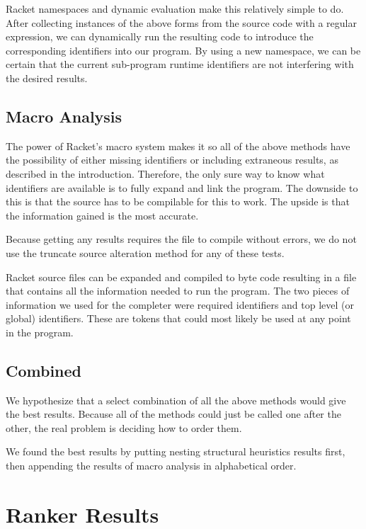 \documentclass[ms,electronic,twosidetoc,letterpaper,chaptercenter,parttop,lol,lof,lot]{byumsphd}
\begin{document}
Racket namespaces and dynamic evaluation make this relatively simple to do.
After collecting instances of the above forms from the source code with a regular expression, we can dynamically run the resulting code to introduce the corresponding identifiers into our program.
By using a new namespace, we can be certain that the current sub-program runtime identifiers are not interfering with the desired results.

\subsection{Macro Analysis}

The power of Racket's macro system makes it so all of the above methods have the possibility of either missing identifiers or including extraneous results, as described in the introduction.
Therefore, the only sure way to know what identifiers are available is to fully expand and link the program.
The downside to this is that the source has to be compilable for this to work.
The upside is that the information gained is the most accurate.

Because getting any results requires the file to compile without errors, we do not use the truncate source alteration method for any of these tests.

Racket source files can be expanded and compiled to byte code resulting in a file that contains all the information needed to run the program.
The two pieces of information we used for the completer were required identifiers and top level (or global) identifiers.
These are tokens that could most likely be used at any point in the program.

\subsection{Combined}

We hypothesize that a select combination of all the above methods would give the best results.
Because all of the methods could just be called one after the other, the real problem is deciding how to order them.

We found the best results by putting nesting structural heuristics results first, then appending the results of macro analysis in alphabetical order.

\section{Ranker Results}
\end{document}
